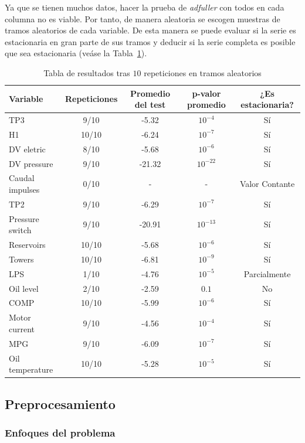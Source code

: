 \documentclass[12pt,letterpaper]{article}
\begin{document}
Ya que se tienen muchos datos, hacer la prueba de \textit{adfuller} con todos en cada columna no es viable. Por tanto, de manera aleatoria se escogen muestras de tramos aleatorios de cada variable. De esta manera se puede evaluar si la serie es estacionaria en gran parte de sus tramos y deducir si la serie completa es posible que sea estacionaria (veáse la Tabla~\ref{tab:stationary_results}).

\begin{table}[htp]
    \centering
    \begin{tabular}{lcccc}
    \hline
    Variable & Repeticiones & Promedio del test & p-valor promedio & ¿Es estacionaria? \\
    \hline
    TP3 & 9/10 & -5.32 & $10^{-4}$ & Sí \\
    H1 & 10/10 & -6.24 & $10^{-7}$ & Sí \\
    DV eletric & 8/10 & -5.68 & $10^{-6}$ & Sí \\
    DV pressure & 9/10 & -21.32 & $10^{-22}$ & Sí \\
    Caudal impulses & 0/10 & - & - & Valor Contante \\
    TP2 & 9/10 & -6.29 & $10^{-7}$ & Sí \\
    Pressure switch & 9/10 & -20.91 & $10^{-13}$ & Sí \\
    Reservoirs & 10/10 & -5.68 & $10^{-6}$ & Sí \\
    Towers & 10/10 & -6.81 & $10^{-9}$ & Sí \\
    LPS & 1/10 & -4.76 & $10^{-5}$ & Parcialmente \\
    Oil level & 2/10 & -2.59 & $0.1$ & No \\
    COMP & 10/10 & -5.99 & $10^{-6}$ & Sí \\
    Motor current & 9/10 & -4.56 & $10^{-4}$ & Sí \\
    MPG & 9/10 & -6.09 & $10^{-7}$ & Sí \\
    Oil temperature & 10/10 & -5.28 & $10^{-5}$ & Sí \\
    \hline
    \end{tabular}
    \caption{Tabla de resultados tras $10$ repeticiones en tramos aleatorios}
    \label{tab:stationary_results}
\end{table}


\subsection{Preprocesamiento}

\subsubsection{Enfoques del problema}
\end{document}

